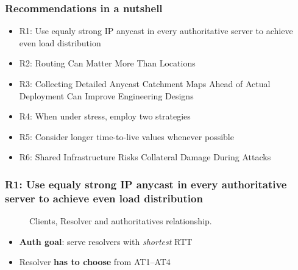 \documentclass[11pt,show 
notes,notheorems,noamsthm,blank]{beamer} %
\begin{document}
\begin{frame}
 \frametitle{Recommendations in a nutshell}
 
 \begin{itemize}
  \item R1: Use equaly strong IP anycast in every authoritative server to
    achieve even load distribution~\cite{Mueller17b}
    
  \item R2:  Routing Can Matter More Than Locations~\cite{Schmidt17a}
  
  \item R3: Collecting Detailed Anycast Catchment Maps Ahead of Actual
    Deployment Can Improve Engineering Designs~\cite{Vries17b}
    
  \item R4:    When under stress, employ two strategies~\cite{Moura16b}
  
  \item R5:  Consider longer time-to-live values whenever 
possible~\cite{Moura18b}
  
    \item R6:  Shared Infrastructure Risks Collateral Damage During 
Attacks~\cite{Moura16b}
    


  

 \end{itemize}

\end{frame}


\begin{frame}
 \frametitle{R1: Use equaly strong IP anycast in every authoritative server to
    achieve even load distribution}
    
    
    
\begin{figure}
\centering

  
  \caption{Clients, Resolver and authoritatives relationship.}
  \label{fig:nl-deployment}

\end{figure}
\vspace{-0.5cm}
\begin{itemize}
 \item\textbf{Auth goal}: serve resolvers with \textit{shortest} RTT
 \item Resolver \textbf{has to choose} from AT1--AT4
\end{itemize}



\end{frame}
\end{document}
